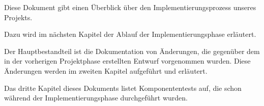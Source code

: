 Diese Dokument gibt einen Überblick über den Implementierungsprozess unseres Projekts.

Dazu wird im nächsten Kapitel der Ablauf der Implementierungsphase erläutert.

Der Hauptbestandteil ist die Dokumentation von Änderungen, die gegenüber dem in der vorherigen Projektphase erstellten Entwurf vorgenommen wurden. Diese Änderungen werden im zweiten Kapitel aufgeführt und erläutert.

Das dritte Kapitel dieses Dokuments listet Komponententests auf, die schon während der Implementierungsphase durchgeführt wurden.